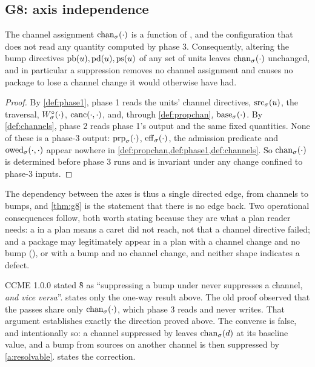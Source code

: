 \subsection{G8: axis independence}

\begin{theorem}
\label{thm:g8}
The channel assignment $\mathrm{chan}_{\sigma}(\cdot)$ is a function of \st{}, \Head{}
and the configuration that does not read any quantity computed by phase 3.
Consequently, altering the bump directives $\mathrm{pb}(u), \mathrm{pd}(u),
\mathrm{ps}(u)$ of any set of units leaves $\mathrm{chan}_{\sigma}(\cdot)$ unchanged, and in
particular a  suppression removes no channel assignment and causes
no package to lose a channel change it would otherwise have had.
\end{theorem}

\begin{proof}
By \cref{def:phase1}, phase 1 reads the units' channel directives, $\mathrm{src}_{\sigma}(u)$,
the traversal, $W^{\circ}_{\sigma}(\cdot)$, $\mathrm{canc}(\cdot,\cdot)$, and, through
\cref{def:propchan}, $\mathrm{base}_{\sigma}(\cdot)$. By \cref{def:channels}, phase 2
reads phase 1's output and the same fixed quantities. None of these is a
phase-3 output: $\mathrm{prp}_{\sigma}(\cdot)$, $\mathrm{eff}_{\sigma}(\cdot)$, the admission
predicate and $\mathrm{owed}_{\sigma}(\cdot,\cdot)$ appear nowhere in
\cref{def:propchan,def:phase1,def:channels}. So
$\mathrm{chan}_{\sigma}(\cdot)$ is determined before phase 3 runs and is invariant under
any change confined to phase-3 inputs.
\end{proof}

The dependency between the axes is thus a single directed edge, from channels
to bumps, and \cref{thm:g8} is the statement that there is no edge back. Two
operational consequences follow, both worth stating because they are what a
plan reader needs: a  in a plan means a caret did not reach, not
that a channel directive failed; and a package may legitimately appear in a
plan with a channel change and no bump (), or with a bump and no
channel change, and neither shape indicates a defect.

\begin{remark}
\label{rem:g8-converse}
CCME 1.0.0 stated \G{8} as ``suppressing a bump under  never
suppresses a channel, \emph{and vice versa}''. \SPEC{} states only the
one-way result above. The old proof observed that
the passes share only $\mathrm{chan}_{\sigma}(\cdot)$, which phase 3 reads and never writes.
That argument establishes exactly the direction proved above. The converse is
false, and intentionally so: a channel suppressed by  leaves
$\mathrm{chan}_{\sigma}(d)$ at its baseline value, and a bump from sources on another
channel is then suppressed by \cref{a:resolvable}.  states the
correction.
\end{remark}
